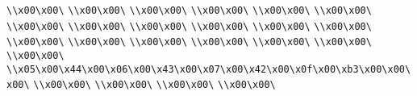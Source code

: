 \verb|\\x00\x00\|\newline
\verb|\\x00\x00\|\newline
\verb|\\x00\x00\|\newline
\verb|\\x00\x00\|\newline
\verb|\\x00\x00\|\newline
\verb|\\x00\x00\|\newline
\verb|\\x00\x00\|\newline
\verb|\\x00\x00\|\newline
\verb|\\x00\x00\|\newline
\verb|\\x00\x00\|\newline
\verb|\\x00\x00\|\newline
\verb|\\x00\x00\|\newline
\verb|\\x00\x00\|\newline
\verb|\\x00\x00\|\newline
\verb|\\x00\x00\|\newline
\verb|\\x00\x00\|\newline
\verb|\\x00\x00\|\newline
\verb|\\x00\x00\|\newline
\verb|\\x00\x00\|\newline
\verb|\\x05\x00\x44\x00\x06\x00\x43\x00\x07\x00\x42\x00\x0f\x00\xb3\x00\x00\x00\|\newline
\verb|\\x00\x00\|\newline
\verb|\\x00\x00\|\newline
\verb|\\x00\x00\|\newline
\verb|\\x00\x00\|\newline
